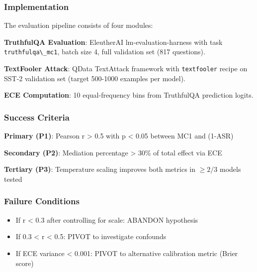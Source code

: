 
\subsubsection{Implementation}

The evaluation pipeline consists of four modules:

\begin{table}[htbp]
\centering
{}
\end{table}

\textbf{TruthfulQA Evaluation}: EleutherAI lm-evaluation-harness with task \texttt{truthfulqa\textbackslash \_mc1}, batch size 4, full validation set (817 questions).

\textbf{TextFooler Attack}: QData TextAttack framework with \texttt{textfooler} recipe on SST-2 validation set (target 500-1000 examples per model).

\textbf{ECE Computation}: 10 equal-frequency bins from TruthfulQA prediction logits.

\subsubsection{Success Criteria}

\textbf{Primary (P1)}: Pearson r > 0.5 with p < 0.05 between MC1 and (1-ASR)

\textbf{Secondary (P2)}: Mediation percentage > 30\% of total effect via ECE

\textbf{Tertiary (P3)}: Temperature scaling improves both metrics in $\geq 2/3$ models tested

\subsubsection{Failure Conditions}

\begin{itemize}
\item If r < 0.3 after controlling for scale: ABANDON hypothesis
\item If 0.3 < r < 0.5: PIVOT to investigate confounds
\item If ECE variance < 0.001: PIVOT to alternative calibration metric (Brier score)
\end{itemize}


